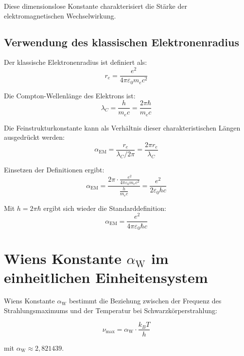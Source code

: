 \documentclass[12pt,a4paper]{article}
\newcommand{\alphaEM}{\alpha_{\text{EM}}}
\newcommand{\alphaW}{\alpha_{\text{W}}}
\begin{document}
	Diese dimensionslose Konstante charakterisiert die Stärke der elektromagnetischen Wechselwirkung.
	
	\subsection{Verwendung des klassischen Elektronenradius}
	\label{subsec:electron_radius}
	
	Der klassische Elektronenradius ist definiert als:
	\begin{equation}
		r_e = \frac{e^2}{4\pi \varepsilon_0 m_e c^2}
	\end{equation}
	
	Die Compton-Wellenlänge des Elektrons ist:
	\begin{equation}
		\lambda_C = \frac{h}{m_e c} = \frac{2\pi\hbar}{m_e c}
	\end{equation}
	
	Die Feinstrukturkonstante kann als Verhältnis dieser charakteristischen Längen ausgedrückt werden:
	\begin{equation}
		\alphaEM = \frac{r_e}{\lambda_C/2\pi} = \frac{2\pi r_e}{\lambda_C}
	\end{equation}
	
	Einsetzen der Definitionen ergibt:
	\begin{equation}
		\alphaEM = \frac{2\pi \cdot \frac{e^2}{4\pi \varepsilon_0 m_e c^2}}{\frac{h}{m_e c}} = \frac{e^2}{2\varepsilon_0 h c}
	\end{equation}
	
	Mit \(h = 2\pi\hbar\) ergibt sich wieder die Standarddefinition:
	\begin{equation}
		\alphaEM = \frac{e^2}{4\pi \varepsilon_0 \hbar c}
	\end{equation}
	
	\section{Wiens Konstante \(\alphaW\) im einheitlichen Einheitensystem}
	\label{sec:wien_constant}
	
	Wiens Konstante \(\alphaW\) bestimmt die Beziehung zwischen der Frequenz des Strahlungsmaximums und der Temperatur bei Schwarzkörperstrahlung:
	
	\begin{equation}
		\label{eq:wien_law}
		\nu_{\text{max}} = \alphaW \cdot \frac{k_B T}{h}
	\end{equation}
	
	mit \(\alphaW \approx 2,821439\).
	
\end{document}
